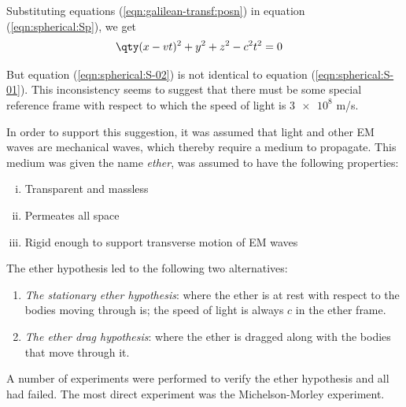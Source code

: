     	Substituting equations (\ref{eqn:galilean-transf:posn}) in equation (\ref{eqn:spherical:Sp}), we get
    	\begin{align}
    		\qty(x-vt)^2+y^2+z^2-c^2t^2&=0 \label{eqn:spherical:S-02}
    	\end{align}
    	
    	But equation (\ref{eqn:spherical:S-02}) is not identical to equation (\ref{eqn:spherical:S-01}). This inconsistency seems to suggest that there must be some special reference frame with respect to which the speed of light is $\num{3e8}$ m/s.
    	
    	In order to support this suggestion, it was assumed that light and other EM waves are mechanical waves, which thereby require a medium to propagate. This medium was given the name \emph{ether}, was assumed to have the following properties:
    	\begin{enumerate}[i.]
    		\item Transparent and massless
    		\item Permeates all space
    		\item Rigid enough to support transverse motion of EM waves
    	\end{enumerate}
    	
    	The ether hypothesis led to the following two alternatives:
    	\begin{enumerate}
    		\item \emph{The stationary ether hypothesis}: where the ether is at rest with respect to the bodies moving through is; the speed of light is always $c$ in the ether frame.
    		\item \emph{The ether drag hypothesis}: where the ether is dragged along with the bodies that move through it.
    	\end{enumerate}
    	
    	A number of experiments were performed to verify the ether hypothesis and all had failed. The most direct experiment was the Michelson-Morley experiment.
